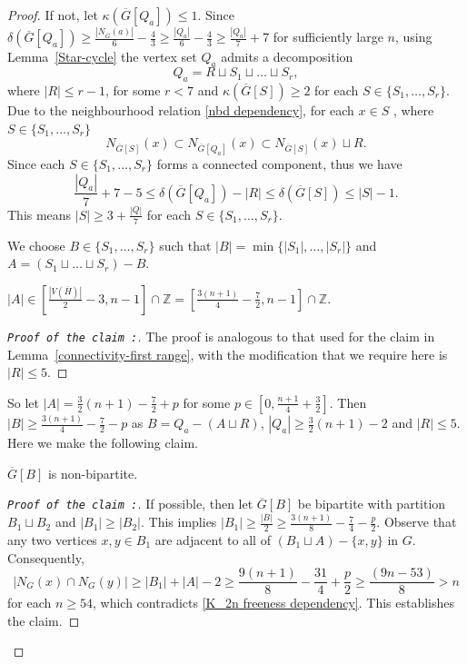 \documentclass[reqno,10pt]{amsart}
\theoremstyle{definition}
\begin{document}
\begin{proof}
If not, let $\kappa(\overline{G}[Q_{a}])\leq 1$. Since $\delta(\overline{G}[Q_{a}])\geq \frac{|N_{\overline{G}}(a)|}{6}-\frac{4}{3}\geq\frac{|Q_{a}|}{6}-\frac{4}{3}\geq \frac{|Q_{a}|}{7}+7$ for sufficiently large $n$, using Lemma~\ref{Star-cycle} the vertex set $Q_{a}$ admits a decomposition  
\begin{equation*}
 Q_{a}= R\sqcup S_{1}\sqcup\ldots\sqcup S_{r},   
\end{equation*}
where $|R|\leq r-1$, for some $r<7$ and $\kappa(\overline{G}[S])\geq 2$ for each $S\in\{S_{1},\ldots,S_{r}\}$. Due to the neighbourhood relation \eqref{nbd dependency}, for each $x\in S$ , where $S\in\{S_{1},\ldots,S_{r}\}$
\begin{equation*} 
N_{\overline{G}[S]}(x)\subset N_{\overline{G}[Q_{a}]}(x)\subset N_{\overline{G}[S]}(x)\sqcup R.    
\end{equation*}
Since each $S\in\{S_{1},\ldots,S_{r}\}$ forms a connected component, thus we have 
\begin{equation*}
 \frac{|Q_{a}|}{7}+7-5\leq\delta(\overline{G}[Q_{a}])-|R|\leq\delta(\overline{G}[S])\leq|S|-1.   
\end{equation*}
This means $|S|\geq3+\frac{|Q|}{7}$ for each $S\in\{S_{1},\ldots,S_{r}\}$.

We choose $B\in\{S_{1},\ldots,S_{r}\}$ such that $|B|=\min\{|S_{1}|,\ldots,|S_{r}|\}$ and $A=(S_{1}\sqcup\ldots\sqcup S_{r})-B$. 

 $|A|\in\left[\frac{|V(\overline{H})|}{2}-3,n-1\right]\cap\mathbb{Z}=\left[\frac{3(n+1)}{4}-\frac{7}{2},n-1\right]\cap\mathbb{Z}$.  
\begin{proof}[\tt{Proof of the claim} :]\renewcommand{\qedsymbol}{}
The proof is analogous to that used for the claim in Lemma~\ref{connectivity-first range}, with the modification that we require here is $|R|\leq 5$.
\end{proof}

\noindent So let $|A|=\frac{3}{2}(n+1)-\frac{7}{2}+p$ for some $p\in[0,\frac{n+1}{4}+\frac{3}{2}]$. Then $|B|\geq \frac{3(n+1)}{4}-\frac{7}{2}-p$ as $B= Q_{a}-(A\sqcup R)$, $|Q_{a}|\geq \frac{3}{2}(n+1)-2$ and $|R|\leq 5$. Here we make the following claim.
  
 $\overline{G}[B]$ is non-bipartite.
\begin{proof}[\tt{Proof of the claim} :]\renewcommand{\qedsymbol}{}
If possible, then let $\overline{G}[B]$ be bipartite with partition $B_{1}\sqcup B_{2}$ and $|B_{1}|\geq |B_{2}|$. This implies $|B_{1}|\geq \frac{|B|}{2}\geq \frac{3(n+1)}{8}-\frac{7}{4}-\frac{p}{2}$. Observe that any two vertices $x,y \in B_{1}$ are adjacent to all of $(B_{1}\sqcup A)-\{x,y\}$ in $G$. Consequently, 
\begin{equation*}
|N_{G}(x)\cap N_{G}(y)|\geq  |B_{1}|+|A|-2 \geq \frac{9(n+1)}{8}-\frac{31}{4}+\frac{p}{2}\geq\frac{(9n-53)}{8}>n
\end{equation*}
for each $n\geq54$, which contradicts \eqref{K_2n freeness dependency}. This establishes the claim.
\end{proof}


\end{proof}
\end{document}
